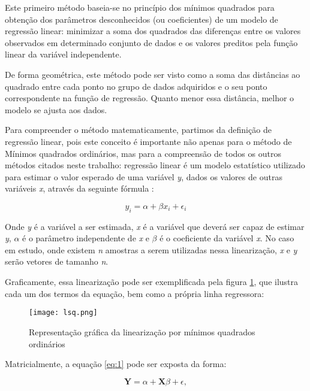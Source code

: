 Este primeiro método baseia-se no princípio dos mínimos quadrados para obtenção dos parâmetros desconhecidos (ou coeficientes) de um modelo de regressão linear: minimizar a soma dos quadrados das diferenças entre os valores observados em determinado conjunto de dados e os valores preditos pela função linear da variável independente.

De forma geométrica, este método pode ser visto como a soma das distâncias ao quadrado entre cada ponto no grupo de dados adquiridos e o seu ponto correspondente na função de regressão. Quanto menor essa distância, melhor o modelo se ajusta aos dados.

Para compreender o método matematicamente, partimos da definição de regressão linear, pois este conceito é importante não apenas para o método de Mínimos quadrados ordinários, mas para a compreensão de todos os outros métodos citados neste trabalho: regressão linear é um modelo estatístico utilizado para estimar o valor esperado de uma variável \textit{y}, dados os valores de outras variáveis \textit{x}, através da seguinte fórmula \cite{ols_intro_econometrics}:

\begin{equation}\label{eq:1}
y_i = \alpha + \beta x_i + \epsilon_i
\end{equation}

Onde \textit{y} é a variável a ser estimada, \textit{x} é a variável que deverá ser capaz de estimar \textit{y}, $\alpha$ é o parâmetro independente de \textit{x} e  $\beta$ é o coeficiente da variável \textit{x}. No caso em estudo, onde existem \textit{n} amostras a serem utilizadas nessa linearização, \textit{x} e \textit{y} serão vetores de tamanho \textit{n}.

Graficamente, essa linearização pode ser exemplificada pela figura \ref{fig:ols_1}, que ilustra cada um dos termos da equação, bem como a própria linha regressora:

\begin{figure}[htp]
    \centering
    \texttt{[image: lsq.png]}
    \caption{Representação gráfica da linearização por mínimos quadrados ordinários}
    \label{fig:ols_1}
\end{figure}

Matricialmente, a equação \ref{eq:1} pode ser exposta da forma:

\begin{equation*} \textbf{Y}= \alpha + \textbf{X}\beta+\epsilon, \end{equation*}

